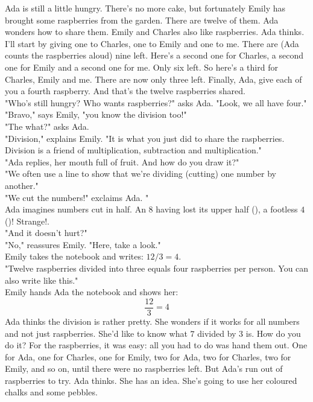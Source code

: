 Ada is still a little hungry.
There's no more cake, but fortunately Emily has brought some raspberries from the garden.
There are twelve of them. Ada wonders how to share them. 
Emily and Charles also like raspberries. 
Ada thinks. I'll start by giving one to Charles, one to Emily and one to me. 
There are (Ada counts the raspberries aloud) nine left. 
Here's a second one for Charles, a second one for Emily and a second one for me. Only six left. 
So here's a third for Charles, Emily and me. There are now only three left. 
Finally, Ada, give each of you a fourth raspberry. And that's the twelve raspberries shared.\\
"Who's still hungry? Who wants raspberries?" asks Ada. "Look, we all have four."\\
"Bravo," says Emily, "you know the division too!"\\
"The what?" asks Ada.\\
"Division," explains Emily. "It is what you just did to share the raspberries. Division is a friend of multiplication, subtraction and multiplication."\\
"Ada replies, her mouth full of fruit. And how do you draw it?"\\
"We often use a line to show that we're dividing (cutting) one number by another."\\
"We cut the numbers!" exclaims Ada. "\\
Ada imagines numbers cut in half. An $8$ having lost its upper half (), a footless $4$ ()! Strange!.\\
"And it doesn't hurt?"\\
"No," reassures Emily. "Here, take a look."\\
Emily takes the notebook and writes: $12/3=4$.\\
"Twelve raspberries divided into three equals four raspberries per person. You can also write like this."\\
Emily hands Ada the notebook and shows her: 
$$\frac{12}{3}=4$$
Ada thinks the division is rather pretty. She wonders if it works for all numbers and not just raspberries. 
She'd like to know what $7$ divided by $3$ is. How do you do it? For the raspberries, it was easy: all you had to do was hand them out. One for Ada, one for Charles, one for Emily, two for Ada, two for Charles, two for Emily, and so on, until there were no raspberries left. 
But Ada's run out of raspberries to try. 
Ada thinks. She has an idea. She's going to use her coloured chalks and some pebbles.

